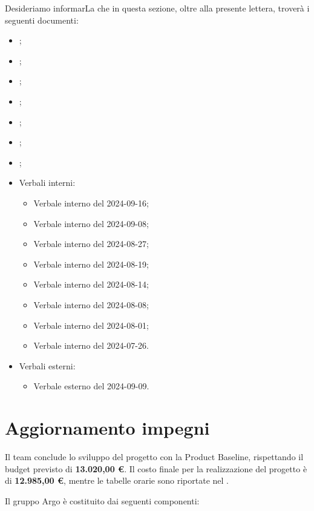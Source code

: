 \par Desideriamo informarLa che in questa sezione, oltre alla presente lettera, troverà i seguenti documenti:
\begin{itemize}
    \item \AnalisiDeiRequisiti;
    \item \Glossario;
    \item \NormeDiProgetto;
    \item \PianoDiProgetto;
    \item \PianoDiQualifica; 
    \item \SpecificaTecnica;
    \item \ManualeUtente;
    \item Verbali interni: 
        \begin{itemize}
            \item Verbale interno del 2024-09-16;
            \item Verbale interno del 2024-09-08;
            \item Verbale interno del 2024-08-27;
            \item Verbale interno del 2024-08-19;
            \item Verbale interno del 2024-08-14;
            \item Verbale interno del 2024-08-08;
            \item Verbale interno del 2024-08-01;
            \item Verbale interno del 2024-07-26.
        \end{itemize}
    \item Verbali esterni:
    \begin{itemize}
        \item Verbale esterno del 2024-09-09.
    \end{itemize}
\end{itemize}

\section*{Aggiornamento impegni}
\par Il team conclude lo sviluppo del progetto con la Product Baseline, rispettando il budget previsto di \textbf{13.020,00 €}. Il costo finale per la realizzazione del progetto è di \textbf{12.985,00 €}, mentre le tabelle orarie sono riportate nel \PianoDiProgetto. \newline

\par Il gruppo Argo è costituito dai seguenti componenti: 

